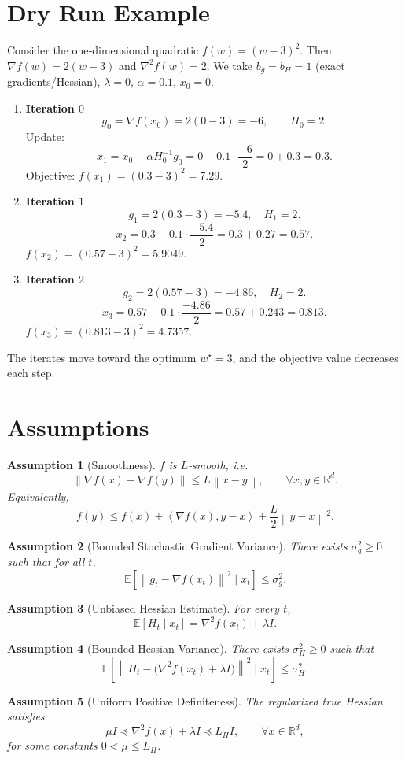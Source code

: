 \documentclass{article}
\newtheorem{assumption}{Assumption}
\newcommand{\E}{\mathbb{E}}
\newcommand{\R}{\mathbb{R}}
\newcommand{\norm}[1]{\left\lVert #1\right\rVert}
\newcommand{\ip}[2]{\left\langle #1,#2\right\rangle}
\begin{document}
\section*{Dry Run Example}
Consider the one‑dimensional quadratic $f(w)=(w-3)^2$. Then $\nabla f(w)=2(w-3)$ and $\nabla^{2}f(w)=2$.  
We take $b_g=b_H=1$ (exact gradients/Hessian), $\lambda=0$, $\alpha=0.1$, $x_0=0$.

\begin{enumerate}
    \item \textbf{Iteration $0$}
    \[
        g_0=\nabla f(x_0)=2(0-3)=-6,\qquad 
        H_0=2.
    \]
    Update:
    \[
        x_1 = x_0-\alpha H_0^{-1}g_0 =0-0.1\cdot\frac{-6}{2}=0+0.3=0.3.
    \]
    Objective: $f(x_1)=(0.3-3)^2=7.29$.
    \item \textbf{Iteration $1$}
    \[
        g_1=2(0.3-3)=-5.4,\quad H_1=2.
    \]
    \[
        x_2 =0.3-0.1\cdot\frac{-5.4}{2}=0.3+0.27=0.57.
    \]
    $f(x_2)=(0.57-3)^2=5.9049$.
    \item \textbf{Iteration $2$}
    \[
        g_2=2(0.57-3)=-4.86,\quad H_2=2.
    \]
    \[
        x_3 =0.57-0.1\cdot\frac{-4.86}{2}=0.57+0.243=0.813.
    \]
    $f(x_3)=(0.813-3)^2=4.7357$.
\end{enumerate}
The iterates move toward the optimum $w^\star=3$, and the objective value decreases each step.

\newpage
\section*{Assumptions}
\begin{assumption}[Smoothness]\label{ass:smooth}
$f$ is $L$‑smooth, i.e.
\[
    \norm{\nabla f(x)-\nabla f(y)}\le L\norm{x-y},\qquad\forall x,y\in\R^{d}.
\]
Equivalently,
\[
    f(y)\le f(x)+\ip{\nabla f(x)}{y-x}+\frac{L}{2}\norm{y-x}^{2}.
\] 
\end{assumption}
\begin{assumption}[Bounded Stochastic Gradient Variance]\label{ass:gradvar}
There exists $\sigma_g^2\ge0$ such that for all $t$,
\[
    \E\!\left[\norm{g_t-\nabla f(x_t)}^{2}\mid x_t\right]\le\sigma_g^{2}.
\]
\end{assumption}
\begin{assumption}[Unbiased Hessian Estimate]\label{ass:hessianunbias}
For every $t$,
\[
    \E\!\left[H_t\mid x_t\right]=\nabla^{2}f(x_t)+\lambda I .
\]
\end{assumption}
\begin{assumption}[Bounded Hessian Variance]\label{ass:hessianvar}
There exists $\sigma_H^{2}\ge0$ such that
\[
    \E\!\left[\norm{H_t-\big(\nabla^{2}f(x_t)+\lambda I\big)}^{2}\mid x_t\right]\le\sigma_H^{2}.
\]
\end{assumption}
\begin{assumption}[Uniform Positive Definiteness]\label{ass:posdef}
The regularized true Hessian satisfies
\[
    \mu I \preceq \nabla^{2}f(x)+\lambda I \preceq L_H I,\qquad\forall x\in\R^{d},
\]
for some constants $0<\mu\le L_H$.
\end{assumption}
\end{document}
